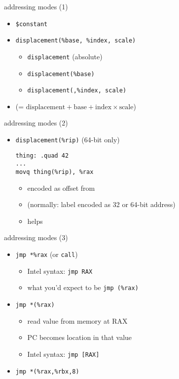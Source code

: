 
\begin{frame}[fragile,label=addressing1]{addressing modes (1)}
    \begin{itemize}
        \item {\tt \$constant}
        \item {\tt displacement(\%base, \%index, scale)}
            \begin{itemize}
            \item {\tt displacement} (absolute)
            \item {\tt displacement(\%base)}
            \item {\tt displacement(,\%index, scale)}
            \end{itemize}
        \item (= $\text{displacement} + \text{base} + \text{index} \times \text{scale}$)
    \end{itemize}
\end{frame}

\begin{frame}[fragile,label=addressing2]{addressing modes (2)}
    \begin{itemize}
        \item {\tt displacement(\%rip)} (64-bit only)
\begin{lstlisting}
thing: .quad 42
...
movq thing(%rip), %rax
\end{lstlisting}
        \begin{itemize}
        \item encoded as offset from 
        \item (normally: label encoded as 32 or 64-bit address)
        \item helps 
        \end{itemize}
    \end{itemize}
\end{frame}

\begin{frame}[fragile,label=addressing3]{addressing modes (3)}
    \begin{itemize}
        \item {\tt jmp *\%rax} (or {\tt call})
        \begin{itemize}
        \item Intel syntax: {\tt jmp RAX}
        \item what you'd expect to be {\tt jmp (\%rax)}
        \end{itemize}
        \item {\tt jmp *(\%rax)}
        \begin{itemize}
        \item read value from memory at RAX
        \item PC becomes location in that value
        \item Intel syntax: {\tt jmp [RAX]}
        \end{itemize}
        \item {\tt jmp *(\%rax,\%rbx,8)}
    \end{itemize}
\end{frame}


